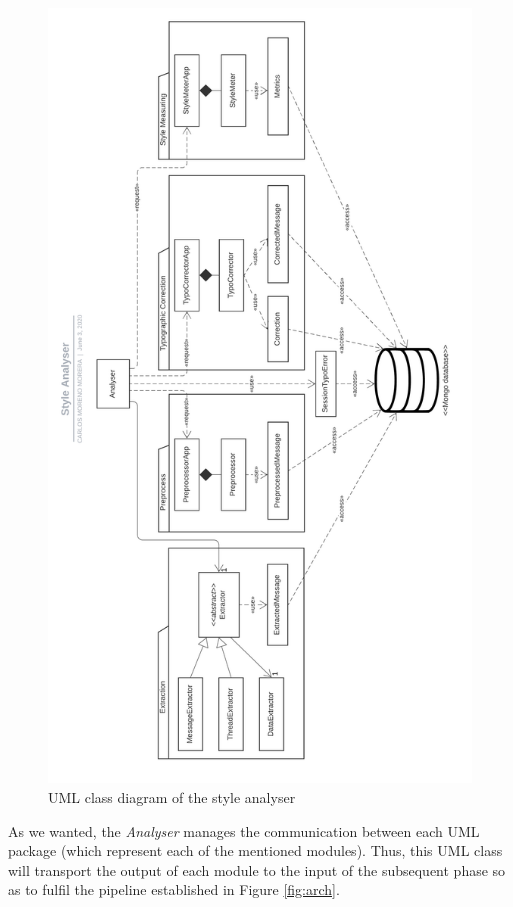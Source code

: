 \begin{figure}[p]
	\centering%
	\includegraphics[height=0.85\paperheight]{Imagenes/Bitmap/Analyser/StyleAnalyserUML.png}%
	\caption{UML class diagram of the style analyser}%
	\label{fig:umlarch}
\end{figure}

As we wanted, the \textit{Analyser} manages the communication between each UML package (which represent each of the mentioned modules). Thus, this UML class will transport the output of each module to the input of the subsequent phase so as to fulfil the pipeline established in Figure \ref{fig:arch}.

